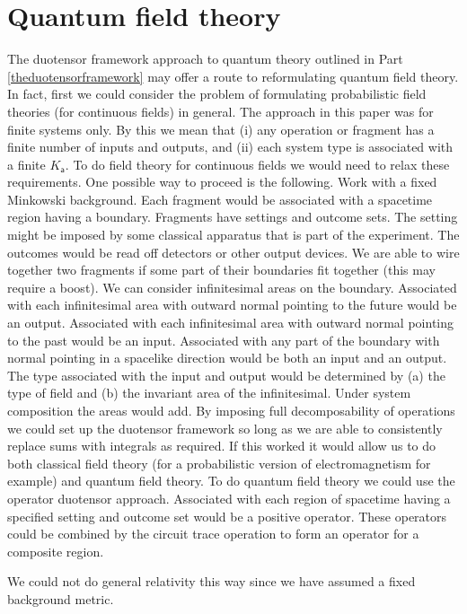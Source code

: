 \documentclass[10pt]{article}
\begin{document}
\section{Quantum field theory}

The duotensor framework approach to quantum theory outlined in Part \ref{theduotensorframework} may offer a route to reformulating quantum field theory.
In fact, first we could consider the problem of formulating probabilistic field theories (for continuous fields) in general.  The approach in this paper was for finite systems only. By this we mean that (i) any operation or fragment has a finite number of inputs and outputs,
and (ii) each system type is associated with a finite $K_\mathsf{a}$. To do field theory for continuous fields we would need to relax these requirements. One possible way to proceed is the following. Work with a fixed Minkowski background. Each fragment would be associated with a spacetime region having a boundary. Fragments have settings and outcome sets. The setting might be imposed by some classical apparatus that is part of the experiment.  The outcomes would be read off detectors or other output devices.  We are able to wire together two fragments if some part of their boundaries fit together (this may require a boost). We can consider infinitesimal areas on the boundary. Associated with each infinitesimal area with outward normal pointing to the future would be an output. Associated with each infinitesimal
area with outward normal pointing to the past would be an input. Associated with any part of the boundary with normal pointing in a spacelike direction
would be both an input and an output. The type associated with the input and output would be determined by (a) the type of field and (b) the invariant area of
the infinitesimal. Under system composition the areas would add. By imposing full decomposability of operations we could set up the duotensor framework so long as we are able to consistently replace sums with integrals as required.  If this worked it would allow us to do both classical field theory (for a probabilistic version of electromagnetism for example) and quantum field theory. To do quantum field theory we could use the operator duotensor approach.  Associated with each region of spacetime having a specified setting and outcome set would be a positive operator.  These operators could be combined by the circuit trace operation to form an operator for a composite region.

We could not do general relativity this way since we have assumed a fixed background metric.
\end{document}
